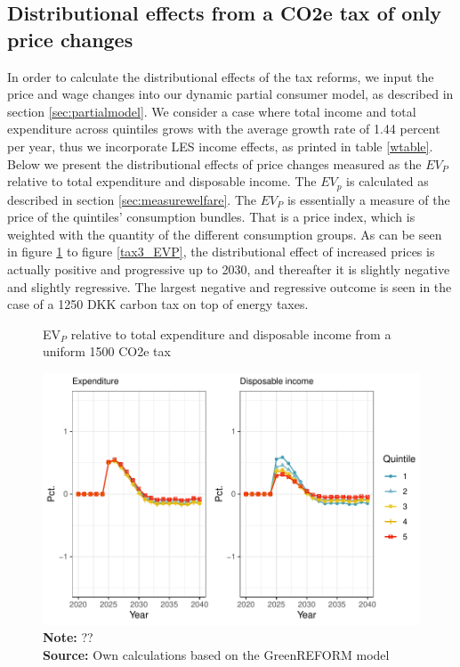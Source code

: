 \subsection{Distributional effects from a CO2e tax of only price changes}
In order to calculate the distributional effects of the tax reforms, we input the price and wage changes into our dynamic partial consumer model, as described in section \ref{sec:partialmodel}. We consider a case where total income and total expenditure across quintiles grows with the average growth rate of 1.44 percent per year, thus we incorporate LES income effects, as printed in table \ref{wtable}.
\\

Below we present the distributional effects of price changes measured as the $EV_P$ relative to total expenditure and disposable income. The $EV_p$ is calculated as described in section \ref{sec:measurewelfare}. The $EV_P$ is essentially a measure of the price of the quintiles' consumption bundles. That is a price index, which is weighted with the quantity of the different consumption groups. As can be seen in figure \ref{tax1_EVP} to figure \ref{tax3_EVP}, the distributional effect of increased prices is actually positive and progressive up to 2030, and thereafter it is slightly negative and slightly regressive. The largest negative and regressive outcome is seen in the case of a 1250 DKK carbon tax on top of energy taxes.

\begin{figure}[H]
\centering
\caption{EV$_P$ relative to total expenditure and disposable income from a uniform 1500 CO2e tax}
\label{tax1_EVP}
\includegraphics[width=.9\textwidth]{Figures/EV_P_tax1.pdf}
\captionsetup{singlelinecheck=off,size=scriptsize}
\setlength{\captionmargin}{10pt}
\caption*{
\textbf{Note:} ??\\
\textbf{Source:} Own calculations based on the GreenREFORM model}
\end{figure}


